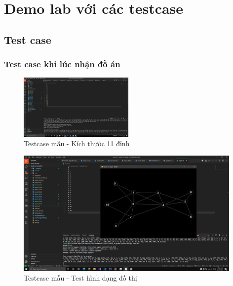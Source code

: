 \documentclass{article}
\begin{document}
\section{Demo lab với các testcase}
\subsection{Test case}
\subsubsection{Test case khi lúc nhận đồ án}
\begin{figure}[H]
\centering
\includegraphics[width=0.5\textwidth]{Test_Case_00.png}
\caption{Testcase mẫu - Kích thước 11 đỉnh}
\end{figure}
\begin{figure}[H]
\centering
\includegraphics[width=0.98\textwidth]{Test_Case_00_Content.png}
\caption{Testcase mẫu - Test hình dạng đồ thị}
\end{figure}
\end{document}
